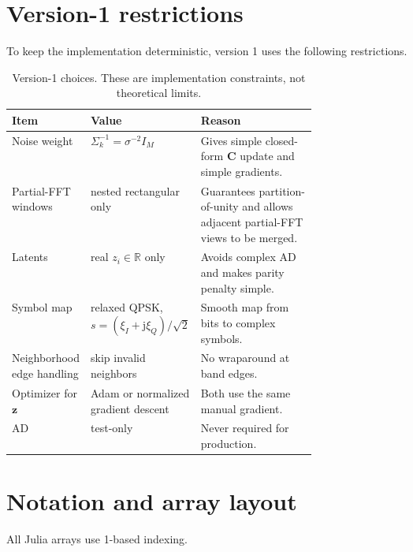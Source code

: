 \documentclass[11pt]{article}
\newcommand{\R}{\mathbb{R}}
\newcommand{\jj}{\mathrm{j}}
\begin{document}
\section{Version-1 restrictions}

To keep the implementation deterministic, version 1 uses the following restrictions.

\begin{table}[h]
\centering
\caption{Version-1 choices.  These are implementation constraints, not theoretical limits.}
\begin{tabular}{@{}llp{0.45\linewidth}@{}}
\toprule
Item & Value & Reason \\
\midrule
Noise weight & $\Sigma_k^{-1}=\sigma^{-2}I_M$ & Gives simple closed-form $\mathbf C$ update and simple gradients. \\
Partial-FFT windows & nested rectangular only & Guarantees partition-of-unity and allows adjacent partial-FFT views to be merged. \\
Latents & real $z_i\in\R$ only & Avoids complex AD and makes parity penalty simple. \\
Symbol map & relaxed QPSK, $s=(\xi_I+\jj\xi_Q)/\sqrt2$ & Smooth map from bits to complex symbols. \\
Neighborhood edge handling & skip invalid neighbors & No wraparound at band edges. \\
Optimizer for $\bm z$ & Adam or normalized gradient descent & Both use the same manual gradient. \\
AD & test-only & Never required for production. \\
\bottomrule
\end{tabular}
\end{table}

\section{Notation and array layout}

All Julia arrays use 1-based indexing.
\end{document}
